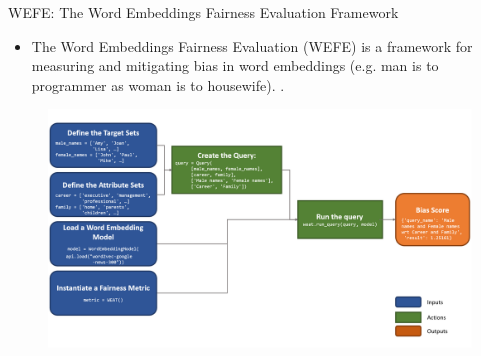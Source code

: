 \documentclass[handout]{beamer}
\begin{document}
\begin{frame}{WEFE: The Word Embeddings Fairness Evaluation Framework}
\begin{scriptsize}
\begin{itemize}
 \item The Word Embeddings Fairness Evaluation (WEFE) is a framework for measuring and mitigating bias in word embeddings (e.g. man is to programmer as woman is to housewife). \cite{badilla2020wefe}.
\end{itemize}
  \begin{figure}[h]
        	\includegraphics[scale = 0.2]{pics/wefedia.png}
        \end{figure}

\end{scriptsize}
\end{frame}
\end{document}

